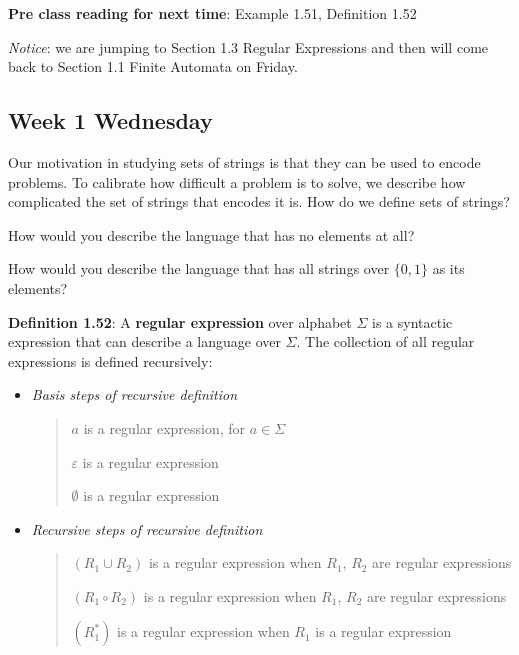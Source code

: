 \documentclass[12pt, oneside]{article}
\begin{document}
{\bf Pre class reading for next time}: Example 1.51, Definition 1.52

{\it Notice}: we are jumping to Section 1.3 Regular Expressions and then will come back 
to Section 1.1 Finite Automata on Friday.


\newpage
\subsection*{Week 1 Wednesday}



Our motivation in studying sets of strings is that they can be used to encode problems.
To calibrate how difficult a problem is to solve, we describe how complicated the set of strings that encodes it is. 
How do we define sets of strings?


\vfill

How would you describe the language that has no elements at all?

\vfill

How would you describe the language that has all strings over $\{0,1\}$ as its elements?

\vfill

\newpage


{\bf Definition 1.52}: A {\bf regular expression} over alphabet $\Sigma$
is a syntactic expression that can describe a language over $\Sigma$. The collection of all regular
expressions is defined recursively:
\begin{itemize}
\item[] {\it Basis steps of recursive definition}
\begin{quote}    
    $a$ is a regular expression, for $a \in \Sigma$

    $\varepsilon$ is a regular expression

    $\emptyset$ is a regular expression
\end{quote}

\item[] {\it Recursive steps of recursive definition}
\begin{quote}
    $(R_1 \cup R_2)$ is a regular expression when $R_1$, $R_2$ are regular expressions 

    $(R_1 \circ R_2)$ is a regular expression when $R_1$, $R_2$ are regular expressions

    $(R_1^*)$ is a regular expression when $R_1$ is a regular expression 
\end{quote}
\end{itemize}
 
\end{document}
